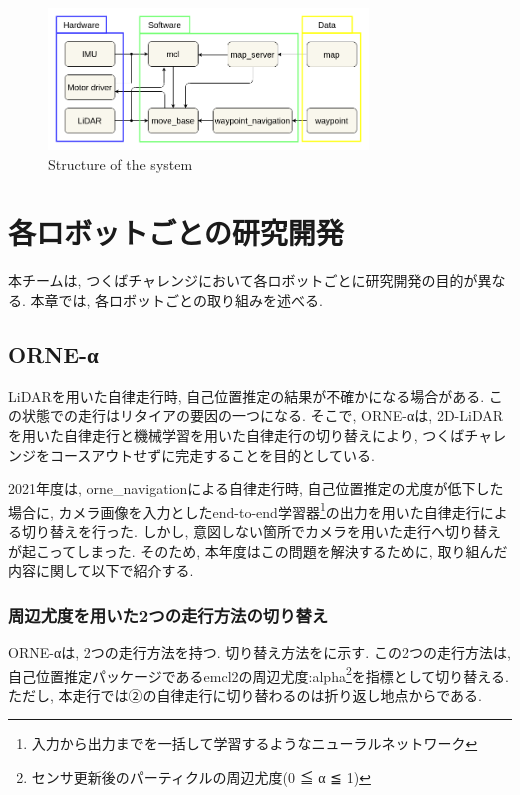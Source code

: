 \documentclass[uplatex, twocolumn, 9pt]{jsproceedings}
\begin{document}
\begin{figure}[h]
  \centering
  \includegraphics[width=85mm]{fig/software.pdf}
  \caption{Structure of the system}
  \label{fig:soft-fig}%
\end{figure}

\newpage
\section{各ロボットごとの研究開発}
本チームは, つくばチャレンジにおいて各ロボットごとに研究開発の目的が異なる. 本章では, 各ロボットごとの取り組みを述べる.

\subsection{ORNE-α}
LiDARを用いた自律走行時, 自己位置推定の結果が不確かになる場合がある. この状態での走行はリタイアの要因の一つになる. そこで, ORNE-αは, 2D-LiDARを用いた自律走行と機械学習を用いた自律走行の切り替えにより, つくばチャレンジをコースアウトせずに完走することを目的としている. \par 2021年度は, orne\_navigationによる自律走行時, 自己位置推定の尤度が低下した場合に, カメラ画像を入力としたend-to-end学習器\footnote[1]{入力から出力までを一括して学習するようなニューラルネットワーク}\cite{end-to-end}の出力を用いた自律走行による切り替えを行った. しかし, 意図しない箇所でカメラを用いた走行へ切り替えが起こってしまった. そのため, 本年度はこの問題を解決するために, 取り組んだ内容に関して以下で紹介する. 

\subsubsection{周辺尤度を用いた2つの走行方法の切り替え}
ORNE-αは, 2つの走行方法を持つ. 切り替え方法をに示す. この2つの走行方法は, 自己位置推定パッケージであるemcl2\cite{emcl2-git}の周辺尤度:alpha\footnote[2]{センサ更新後のパーティクルの周辺尤度(0 ≦ α ≦ 1)}を指標として切り替える. ただし, 本走行では②の自律走行に切り替わるのは折り返し地点からである. 
\end{document}
